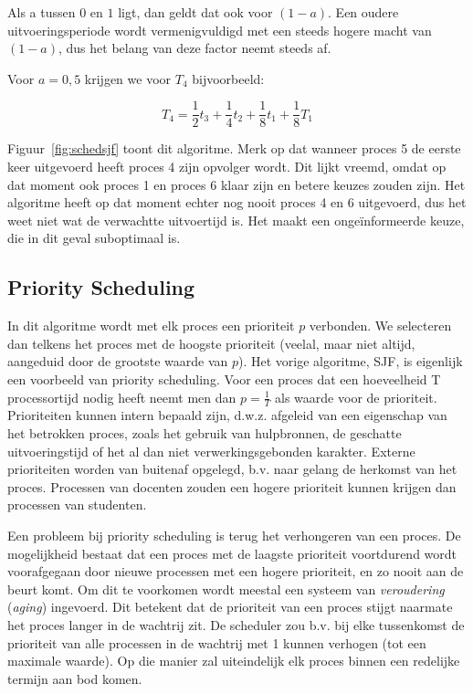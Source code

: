 Als a tussen $0$ en $1$ ligt, dan geldt dat ook voor $(1-a)$. Een
oudere uitvoeringsperiode wordt vermenigvuldigd met een steeds hogere
macht van $(1-a)$, dus het belang van deze factor neemt steeds
af.

Voor $a=0,5$ krijgen we voor $T_4$ bijvoorbeeld:

\begin{displaymath}
T_4 = \frac{1}{2}t_3 + \frac{1}{4}t_2 + \frac{1}{8}t_1 + \frac{1}{8}T_1
\end{displaymath}

Figuur~\ref{fig:schedsjf} toont dit algoritme. Merk op dat wanneer proces 5 de eerste keer uitgevoerd heeft proces 4 zijn opvolger wordt. Dit lijkt vreemd, omdat op dat moment ook proces 1 en proces 6 klaar zijn en betere keuzes zouden zijn. Het algoritme heeft op dat moment echter nog nooit proces 4 en 6 uitgevoerd, dus het weet niet wat de verwachtte uitvoertijd is. Het maakt een onge\"informeerde keuze, die in dit geval suboptimaal is.

\subsection{Priority Scheduling}

In dit algoritme wordt met elk proces een prioriteit $p$
verbonden. We selecteren dan telkens het proces met de hoogste
prioriteit (veelal, maar niet altijd, aangeduid door de grootste
waarde van $p$). Het vorige algoritme, SJF, is eigenlijk een voorbeeld
van priority scheduling. Voor een proces dat een hoeveelheid T processortijd
nodig heeft neemt men dan $p = \frac{1}{T}$ als waarde voor de prioriteit.
Prioriteiten kunnen intern bepaald zijn, d.w.z. afgeleid van een eigenschap van
het betrokken proces, zoals het gebruik van hulpbronnen, de geschatte
uitvoeringstijd of het al dan niet verwerkingsgebonden karakter. Externe
prioriteiten worden van buitenaf opgelegd, b.v. naar gelang de herkomst van het
proces. Processen van docenten zouden een hogere prioriteit kunnen krijgen dan
processen van studenten.

Een probleem bij priority scheduling is terug het verhongeren
van een proces. De mogelijkheid bestaat dat een proces met de
laagste prioriteit voortdurend wordt voorafgegaan door nieuwe
processen met een hogere prioriteit, en zo nooit aan de beurt komt. Om dit te
voorkomen wordt meestal een systeem van \emph{veroudering} (\emph{aging})
ingevoerd. Dit betekent dat de prioriteit van een proces stijgt naarmate het
proces langer in de wachtrij zit. De scheduler zou b.v. bij elke tussenkomst de
prioriteit van alle processen in de wachtrij met 1 kunnen verhogen (tot een
maximale waarde). Op die manier zal uiteindelijk elk proces binnen een redelijke
termijn aan bod komen.

